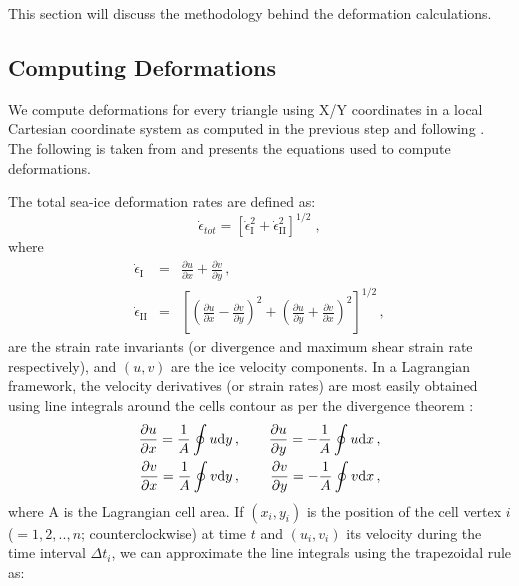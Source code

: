 \documentclass{article}
\begin{document}
    This section will discuss the methodology behind the deformation calculations.

    \subsection{Computing Deformations}

    We compute deformations for every triangle using X/Y coordinates in a local Cartesian coordinate system as computed in the previous step and following \citep{bouchat_reassessing_2020}. The following is taken from \citep{bouchat_reassessing_2020} and presents the equations used to compute deformations.

    The total sea-ice deformation rates are defined as:
    \begin{equation}
        \dot{\epsilon}_{tot} = \left[ \dot{\epsilon}^2_{\mathrm{I}}+\dot{\epsilon}^2_{\mathrm{II}} \right]^{1/2} \;,
    \end{equation}
    where
    \begin{eqnarray}
        \dot{\epsilon}_{\mathrm{I}} &= &\frac{\partial u}{\partial x}+\frac{\partial v}{\partial y} \, , \label{eq:eps_I} \\
        \dot{\epsilon}_{\mathrm{II}} &= &\left[ \left( \frac{\partial u}{\partial x} - \frac{\partial v}{\partial y}\right)^{2} + \left( \frac{\partial u}{\partial y} + \frac{\partial v}{\partial x}\right)^{2}   \right]^{1/2} \, , \label{eq:eps_II}
    \end{eqnarray}
    are the strain rate invariants (or divergence and maximum shear strain rate respectively), and $(u,v)$ are the ice velocity components. In a Lagrangian framework, the velocity derivatives (or strain rates) are most easily obtained using line integrals around the cells contour as per the divergence theorem \citep{lindsay_seaice_2003}:
    \begin{eqnarray}
        \frac{\partial u}{\partial x}  = \frac{1}{A}\oint u \textrm{d}y \, ,&  \hspace{0.4cm} & \frac{\partial u}{\partial y}  = -\frac{1}{A}\oint u \textrm{d}x \, , \nonumber \\
        \frac{\partial v}{\partial x}  = \frac{1}{A}\oint v \textrm{d}y \, ,&  \hspace{0.4cm}  & \frac{\partial v}{\partial y}  = -\frac{1}{A}\oint v \textrm{d}x\, ,
        \label{eq:dudx}
    \end{eqnarray}
    where A is the Lagrangian cell area. If $(x_{i}, y_{i})$ is the position of the cell vertex $i$ ($=1,2,..,n$; counterclockwise) at time $t$ and $(u_{i}, v_{i})$ its velocity during the time interval $\Delta t_{i}$, we can approximate the line integrals using the trapezoidal rule as:
\end{document}
